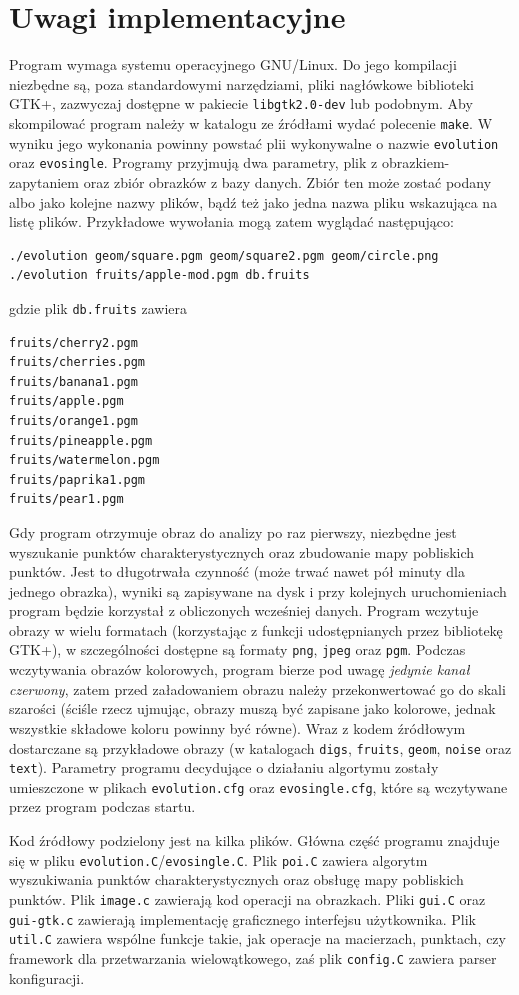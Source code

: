\documentclass[a4paper,12pt,leqno]{article}
\begin{document}
\section{Uwagi implementacyjne}

Program wymaga systemu operacyjnego GNU/Linux. Do jego kompilacji niezbędne są, poza standardowymi narzędziami, pliki nagłówkowe biblioteki GTK+,
zazwyczaj dostępne w pakiecie \texttt{libgtk2.0-dev} lub podobnym. Aby skompilować program należy w katalogu ze źródłami wydać polecenie \texttt{make}.
W wyniku jego wykonania powinny powstać plii wykonywalne o nazwie \texttt{evolution} oraz \texttt{evosingle}. Programy przyjmują dwa parametry, plik z
obrazkiem-zapytaniem oraz zbiór obrazków z bazy danych. Zbiór ten może zostać podany albo jako kolejne nazwy plików, bądź też jako jedna nazwa pliku
wskazująca na listę plików. Przykładowe wywołania mogą zatem wyglądać następująco:
\begin{verbatim}./evolution geom/square.pgm geom/square2.pgm geom/circle.png
./evolution fruits/apple-mod.pgm db.fruits\end{verbatim}
gdzie plik \texttt{db.fruits} zawiera
\begin{verbatim}
fruits/cherry2.pgm
fruits/cherries.pgm
fruits/banana1.pgm
fruits/apple.pgm
fruits/orange1.pgm
fruits/pineapple.pgm
fruits/watermelon.pgm
fruits/paprika1.pgm
fruits/pear1.pgm
\end{verbatim}
Gdy program otrzymuje obraz do analizy po raz pierwszy, niezbędne jest wyszukanie punktów charakterystycznych oraz zbudowanie mapy pobliskich punktów.
Jest to długotrwała czynność (może trwać nawet pół minuty dla jednego obrazka), wyniki są zapisywane na dysk i przy kolejnych uruchomieniach program
będzie korzystał z obliczonych wcześniej danych. Program wczytuje obrazy w wielu formatach (korzystając z funkcji udostępnianych przez bibliotekę GTK+),
w szczególności dostępne są formaty \texttt{png}, \texttt{jpeg} oraz \texttt{pgm}. Podczas wczytywania obrazów kolorowych, program bierze pod uwagę
\emph{jedynie kanał czerwony}, zatem przed załadowaniem obrazu należy przekonwertować go do skali szarości (ściśle rzecz ujmując, obrazy muszą być zapisane
jako kolorowe, jednak wszystkie składowe koloru powinny być równe). Wraz z kodem źródłowym dostarczane są przykładowe obrazy (w katalogach \texttt{digs},
\texttt{fruits}, \texttt{geom}, \texttt{noise} oraz \texttt{text}). Parametry programu decydujące o działaniu algortymu zostały umieszczone w plikach
\texttt{evolution.cfg} oraz \texttt{evosingle.cfg}, które są wczytywane przez program podczas startu.

Kod źródłowy podzielony jest na kilka plików. Główna część programu znajduje się w pliku \texttt{evolution.C}/\texttt{evosingle.C}. Plik \texttt{poi.C}
zawiera algorytm wyszukiwania punktów charakterystycznych oraz obsługę mapy pobliskich punktów. Plik \texttt{image.c} zawierają kod operacji na obrazkach.
Pliki \texttt{gui.C} oraz \texttt{gui-gtk.c} zawierają implementację graficznego interfejsu użytkownika. Plik \texttt{util.C} zawiera wspólne funkcje takie,
jak operacje na macierzach, punktach, czy framework dla przetwarzania wielowątkowego, zaś plik \texttt{config.C} zawiera parser konfiguracji.
\end{document}
